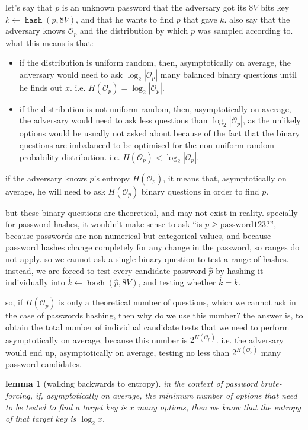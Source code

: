 \documentclass[twocolumn]{article}
\newtheorem{lemma}{lemma}[section]
\DeclareMathOperator{\hash}{\mathtt{hash}}
\begin{document}
let's say that $p$ is an unknown password that the adversary got its $8V$
bits key $k \gets \hash(p, 8V)$, and that he wants to find $p$ that gave
$k$.  also say that the adversary knows $\mathcal{O}_p$ and the
distribution by which $p$ was sampled according to.  what this means is
that:
\begin{itemize}
    \item if the distribution is uniform random, then, asymptotically on
    average, the adversary would need to ask $\log_2 |\mathcal{O}_p|$ many
    balanced binary questions until he finds out $x$.  i.e.
    $H(\mathcal{O}_p) = \log_2 |\mathcal{O}_p|$.

    \item if the distribution is not uniform random, then, asymptotically
    on average, the adversary would need to ask less questions than $\log_2
    |\mathcal{O}_p|$, as the unlikely options would be usually not asked
    about because of the fact that the binary questions are imbalanced to
    be optimised for the non-uniform random probability distribution.  i.e.
    $H(\mathcal{O}_p) < \log_2 |\mathcal{O}_p|$.
\end{itemize}

if the adversary knows $p$'s entropy $H(\mathcal{O}_p)$, it means that,
asymptotically on average, he will need to ask $H(\mathcal{O}_p)$ binary
questions in order to find $p$.

but these binary questions are theoretical, and may not exist in reality.
specially for password hashes, it wouldn't make sense to ask ``is $p \ge
\text{password123}$?'', because passwords are non-numerical but
categorical values, and because password hashes change completely for any
change in the password, so ranges do not apply.  so we cannot ask a single
binary question to test a range of hashes.  instead, we are forced to test
every candidate password $\hat p$ by hashing it individually into $\hat k
\gets \hash(\hat p, 8V)$, and testing whether $\hat k = k$.

so, if $H(\mathcal{O}_p)$ is only a theoretical number of questions, which
we cannot ask in the case of passwords hashing, then why do we use this
number?  the answer is, to obtain the total number of individual candidate
tests that we need to perform asymptotically on average, because this
number is $2^{H(\mathcal{O}_p)}$.   i.e. the adversary would end up,
asymptotically on average, testing no less than $2^{H(\mathcal{O}_p)}$ many
password candidates.

\begin{lemma}[walking backwards to
entropy]\label{theorem_back_to_entropy}
    in the context of password brute-forcing, if, asymptotically on
    average, the minimum number of options that need to be tested to find a
    target key is $x$ many options, then we know that the entropy of that
    target key is $\log_2 x$.
\end{lemma}
\end{document}
